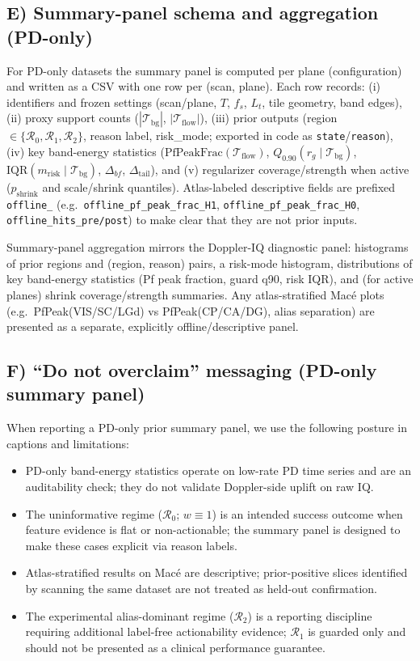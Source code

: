 \documentclass[11pt]{article}
\begin{document}
\subsection*{E) Summary-panel schema and aggregation (PD-only)}
For PD-only datasets the summary panel is computed per plane (configuration) and written as a CSV with one row per (scan, plane). Each row records: (i) identifiers and frozen settings (scan/plane, $T$, $f_s$, $L_t$, tile geometry, band edges), (ii) proxy support counts ($|\mathcal{T}_{\mathrm{bg}}|$, $|\mathcal{T}_{\mathrm{flow}}|$), (iii) prior outputs (region $\in\{\mathcal{R}_0,\mathcal{R}_1,\mathcal{R}_2\}$, reason label, risk\_mode; exported in code as \texttt{state}/\texttt{reason}), (iv) key band-energy statistics ($\mathrm{PfPeakFrac}(\mathcal{T}_{\mathrm{flow}})$, $Q_{0.90}(r_g\mid\mathcal{T}_{\mathrm{bg}})$, $\mathrm{IQR}(m_{\mathrm{risk}}\mid\mathcal{T}_{\mathrm{bg}})$, $\Delta_{bf}$, $\Delta_{\mathrm{tail}}$), and (v) regularizer coverage/strength when active ($p_{\mathrm{shrink}}$ and scale/shrink quantiles). Atlas-labeled descriptive fields are prefixed \texttt{offline\_} (e.g.\ \texttt{offline\_pf\_peak\_frac\_H1}, \texttt{offline\_pf\_peak\_frac\_H0}, \texttt{offline\_hits\_pre/post}) to make clear that they are not prior inputs.

Summary-panel aggregation mirrors the Doppler-IQ diagnostic panel: histograms of prior regions and (region, reason) pairs, a risk-mode histogram, distributions of key band-energy statistics (Pf peak fraction, guard q90, risk IQR), and (for active planes) shrink coverage/strength summaries. Any atlas-stratified Mac{\'e} plots (e.g.\ PfPeak(VIS/SC/LGd) vs PfPeak(CP/CA/DG), alias separation) are presented as a separate, explicitly offline/descriptive panel.

\subsection*{F) ``Do not overclaim'' messaging (PD-only summary panel)}
When reporting a PD-only prior summary panel, we use the following posture in captions and limitations:
\begin{itemize}[nosep]
  \item PD-only band-energy statistics operate on low-rate PD time series and are an auditability check; they do not validate Doppler-side uplift on raw IQ.
  \item The uninformative regime ($\mathcal{R}_0$; $w\equiv 1$) is an intended success outcome when feature evidence is flat or non-actionable; the summary panel is designed to make these cases explicit via reason labels.
  \item Atlas-stratified results on Mac{\'e} are descriptive; prior-positive slices identified by scanning the same dataset are not treated as held-out confirmation.
  \item The experimental alias-dominant regime ($\mathcal{R}_2$) is a reporting discipline requiring additional label-free actionability evidence; $\mathcal{R}_1$ is guarded only and should not be presented as a clinical performance guarantee.
\end{itemize}
\end{document}
